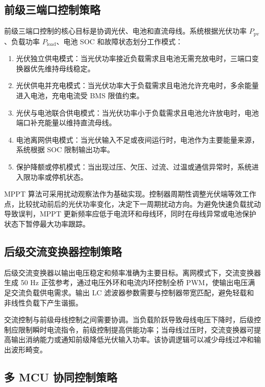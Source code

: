 \subsection{前级三端口控制策略}

前级三端口控制的核心目标是协调光伏、电池和直流母线。系统根据光伏功率 $P_{\mathrm{pv}}$、负载功率 $P_{\mathrm{load}}$、电池 SOC 和故障状态划分工作模式：

\begin{enumerate}[label=\arabic*、, leftmargin=*, itemsep=0.8ex, parsep=0pt, topsep=0.5ex]
  \item 光伏独立供电模式：当光伏功率接近负载需求且电池无需充放电时，三端口变换器优先维持母线稳定。
  \item 光伏供电并充电模式：当光伏功率大于负载需求且电池允许充电时，多余能量进入电池，充电电流受 BMS 限值约束。
  \item 光伏与电池联合供电模式：当光伏功率小于负载需求且电池允许放电时，电池端口补充能量以维持直流母线。
  \item 电池离网供电模式：当光伏输入不足或夜间运行时，电池作为主要能量来源，系统根据 SOC 限制输出功率。
  \item 保护降额或停机模式：当出现过压、欠压、过流、过温或通信异常时，系统进入限功率或停机状态。
\end{enumerate}

MPPT 算法可采用扰动观察法作为基础实现。控制器周期性调整光伏端等效工作点，比较扰动前后的光伏功率变化，决定下一周期扰动方向。为避免快速负载扰动导致误判，MPPT 更新频率应低于电流环和母线环，同时在母线异常或电池保护状态下暂停最大功率跟踪。

\subsection{后级交流变换器控制策略}

后级交流变换器以输出电压稳定和频率准确为主要目标。离网模式下，交流变换器生成 50 Hz 正弦参考，通过电压外环和电流内环控制全桥 PWM，使输出电压满足交流负载供电需求。输出 LC 滤波器参数需要与控制器带宽匹配，避免轻载和非线性负载下产生谐振。

交流控制与前级母线控制之间需要协调。当负载阶跃导致母线电压下降时，后级控制应限制瞬时电流指令，前级控制提高供能功率；当母线过压时，交流变换器可提高输出消纳能力或通知前级降低光伏输入功率。该协调逻辑可以减少母线过冲和输出波形畸变。

\subsection{多 MCU 协同控制策略}

